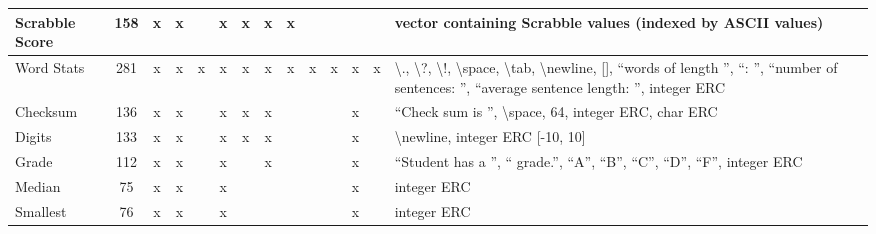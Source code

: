 \documentclass{sig-alternate}
\begin{document}
\begin{table*}
\begin{tabular}{|>{\raggedright}p{3.1cm}|c|ccccccccccc|>{\raggedright}p{5.5cm}|}
\hline
Scrabble Score             & 158             & x    & x       &       & x       & x    & x      & x                  &                  &                   &       &            & vector containing Scrabble values (indexed by ASCII values)                                                                                                                                                                 \tabularnewline
\hline
Word Stats                 & 281             & x    & x       & x     & x       & x    & x      & x                  & x                & x                 & x     & x          & \textbackslash ., \textbackslash ?, \textbackslash !, \textbackslash space, \textbackslash tab, \textbackslash newline, {[}{]}, ``words of length '', ``: '', ``number of sentences: '', ``average sentence length: '', integer ERC \tabularnewline
\hline
Checksum                   & 136             & x    & x       &       & x       & x    & x      &                    &                  &                   & x     &            & ``Check sum is '', \textbackslash space, 64, integer ERC, char ERC                                                                                                                                                            \tabularnewline
\hline
Digits                     & 133             & x    & x       &       & x       & x    & x      &                    &                  &                   & x     &            & \textbackslash newline, integer ERC {[}-10, 10{]}                                                                                                                                                                           \tabularnewline
\hline
Grade                      & 112             & x    & x       &       & x       &      & x      &                    &                  &                   & x     &            & ``Student has a '', `` grade.'', ``A'', ``B'', ``C'', ``D'', ``F'', integer ERC                                                                                                                                                           \tabularnewline
\hline
Median                     & 75              & x    & x       &       & x       &      &        &                    &                  &                   & x     &            & integer ERC                                                                                                                                                                                                                 \tabularnewline
\hline
Smallest                   & 76              & x    & x       &       & x       &      &        &                    &                  &                   & x     &            & integer ERC                                                                                                                                                                                                                 \tabularnewline

\end{tabular}
\end{table*}
\end{document}
